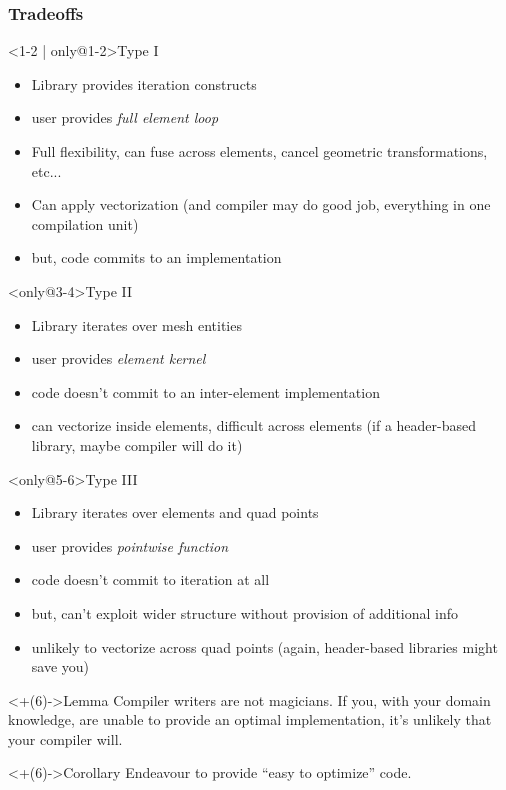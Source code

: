 \documentclass[presentation]{beamer}
\begin{document}
\begin{frame}[t]
  \frametitle{Tradeoffs}
  \begin{block}<1-2 | only@1-2>{Type I}
    \begin{itemize}
    \item Library provides iteration constructs
    \item user provides \emph{full element loop}
    \end{itemize}
  \end{block}
  \begin{itemize}[<1-2 | only@2>]
  \item Full flexibility, can fuse across elements, cancel geometric
    transformations, etc...
  \item Can apply vectorization (and compiler may do good job,
    everything in one compilation unit)
  \item but, code commits to an implementation
  \end{itemize}
  \begin{block}<only@3-4>{Type II}
    \begin{itemize}
    \item Library iterates over mesh entities
    \item user provides \emph{element kernel}
    \end{itemize}
  \end{block}
  \begin{itemize}[<only@4>]
  \item code doesn't commit to an inter-element implementation
  \item can vectorize inside elements, difficult across elements (if a
    header-based library, maybe compiler will do it)
  \end{itemize}
  \begin{block}<only@5-6>{Type III}
    \begin{itemize}
    \item Library iterates over elements and quad points
    \item user provides \emph{pointwise function}
    \end{itemize}
  \end{block}
  \begin{itemize}[<only@6>]
  \item code doesn't commit to iteration at all
  \item but, can't exploit wider structure without provision of
    additional info
  \item unlikely to vectorize across quad points (again, header-based
    libraries might save you)
  \end{itemize}

  \begin{block}<+(6)->{Lemma}
    Compiler writers are not magicians.  If you, with your domain
    knowledge, are unable to provide an optimal implementation, it's
    unlikely that your compiler will.
  \end{block}
  \begin{block}<+(6)->{Corollary}
    Endeavour to provide ``easy to optimize'' code.
  \end{block}
\end{frame}
\end{document}
